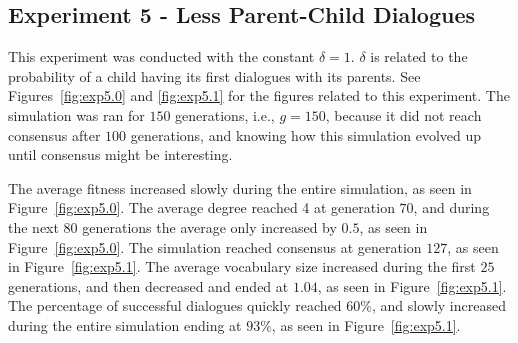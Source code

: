 \clearpage
\subsection{Experiment 5 - Less Parent-Child Dialogues}
This experiment was conducted with the constant $\delta = 1$. $\delta$ is related to the probability of a child having its first dialogues with its parents. See Figures~\ref{fig:exp5.0} and \ref{fig:exp5.1} for the figures related to this experiment. The simulation was ran for $150$ generations, i.e., $g = 150$, because it did not reach consensus after $100$ generations, and knowing how this simulation evolved up until consensus might be interesting. 

The average fitness increased slowly during the entire simulation, as seen in Figure~\ref{fig:exp5.0}. The average degree reached 4 at generation $70$, and during the next $80$ generations the average only increased by $0.5$, as seen in Figure~\ref{fig:exp5.0}. The simulation reached consensus at generation $127$, as seen in Figure~\ref{fig:exp5.1}. The average vocabulary size increased during the first $25$ generations, and then decreased and ended at $1.04$, as seen in Figure~\ref{fig:exp5.1}. The percentage of successful dialogues quickly reached $60\%$, and slowly increased during the entire simulation ending at $93\%$, as seen in Figure~\ref{fig:exp5.1}.  

